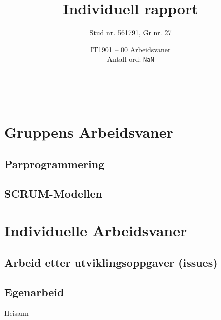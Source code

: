 \documentclass[a4paper, 12pt]{article}  %
\title{Individuell rapport}             %
\author{Stud nr. 561791, Gr nr. 27}     %
\date{IT1901 -- 00 Arbeidsvaner
\\[1em]Antall ord: \texttt{NaN}}        %
\begin{document}
\maketitle
\emph{}\\[1em]
\tableofcontents %
\newpage

\section{Gruppens Arbeidsvaner}

\subsection{Parprogrammering}

\subsection{SCRUM-Modellen}

\section{Individuelle Arbeidsvaner}

\subsection{Arbeid etter utviklingsoppgaver (issues)}

\subsection{Egenarbeid}

\cite{refleks}

Heisann

\newpage
\printbibliography[heading=bibintoc] %
\end{document}
